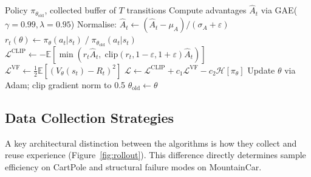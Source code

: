 \documentclass[a4paper,12pt]{article}
\begin{document}
\begin{algorithm}[H]
\caption{PPO --- Policy Update}
\label{alg:ppo}
\begin{algorithmic}[1]
\Input Policy $\pi_{\theta_{\text{old}}}$, collected buffer of $T$ transitions
\State Compute advantages $\hat{A}_t$ via GAE($\gamma=0.99, \lambda=0.95$)
\State Normalise: $\hat{A}_t \leftarrow (\hat{A}_t - \mu_A)/(\sigma_A + \varepsilon)$
 
    \State $r_t(\theta) \leftarrow \pi_\theta(a_t|s_t)\;/\;\pi_{\theta_{\text{old}}}(a_t|s_t)$
    \State $\mathcal{L}^{\text{CLIP}} \leftarrow -\mathbb{E}\!\left[\min\!\left(r_t\hat{A}_t,\;\text{clip}(r_t, 1-\varepsilon, 1+\varepsilon)\hat{A}_t\right)\right]$
    \State $\mathcal{L}^{\text{VF}} \leftarrow \tfrac{1}{2}\mathbb{E}\!\left[(V_\theta(s_t) - R_t)^2\right]$
    \State $\mathcal{L} \leftarrow \mathcal{L}^{\text{CLIP}} + c_1\mathcal{L}^{\text{VF}} - c_2\mathcal{H}[\pi_\theta]$ 
    \State Update $\theta$ via Adam; clip gradient norm to 0.5
  \EndFor
\EndFor
\State $\theta_{\text{old}} \leftarrow \theta$
\end{algorithmic}
\end{algorithm}

\subsection{Data Collection Strategies}

A key architectural distinction between the algorithms is how they collect and reuse experience (Figure~\ref{fig:rollout}). This difference directly determines sample efficiency on CartPole and structural failure modes on MountainCar.
\end{document}

